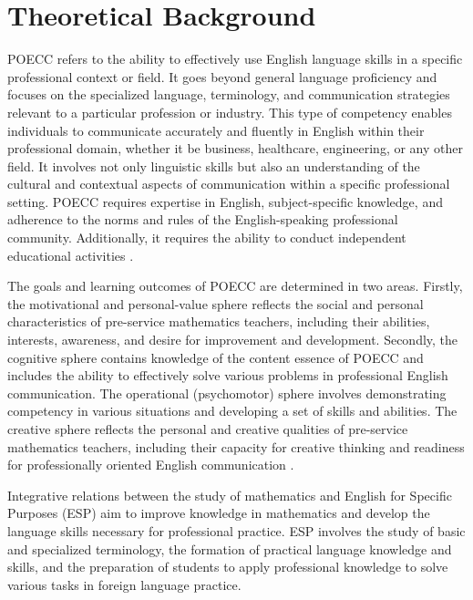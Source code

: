 \section{Theoretical Background}\label{sec-theoreticalbackground}
	
POECC refers to the ability to effectively use English language skills in a specific professional context or field. It goes beyond general language proficiency and focuses on the specialized language, terminology, and communication strategies relevant to a particular profession or industry. This type of competency enables individuals to communicate accurately and fluently in English within their professional domain, whether it be business, healthcare, engineering, or any other field. It involves not only linguistic skills but also an understanding of the cultural and contextual aspects of communication within a specific professional setting. POECC requires expertise in English, subject-specific knowledge, and adherence to the norms and rules of the English-speaking professional community. Additionally, it requires the ability to conduct independent educational activities \cite{dmitrenko2020autonomous}.

The goals and learning outcomes of POECC are determined in two areas. Firstly, the motivational and personal-value sphere reflects the social and personal characteristics of pre-service mathematics teachers, including their abilities, interests, awareness, and desire for improvement and development. Secondly, the cognitive sphere contains knowledge of the content essence of POECC and includes the ability to effectively solve various problems in professional English communication. The operational (psychomotor) sphere involves demonstrating competency in various situations and developing a set of skills and abilities. The creative sphere reflects the personal and creative qualities of pre-service mathematics teachers, including their capacity for creative thinking and readiness for professionally oriented English communication \cite{dmitrenko2020autonomousA}.

Integrative relations between the study of mathematics and English for Specific Purposes (ESP) aim to improve knowledge in mathematics and develop the language skills necessary for professional practice. ESP involves the study of basic and specialized terminology, the formation of practical language knowledge and skills, and the preparation of students to apply professional knowledge to solve various tasks in foreign language practice.

